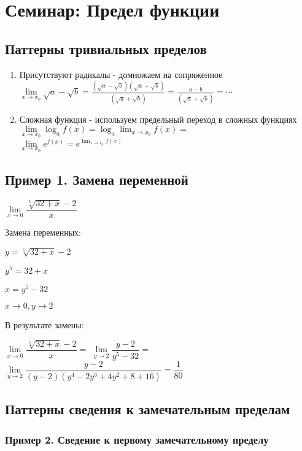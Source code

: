 \section{Семинар: Предел функции}

\subsection{Паттерны тривиальных пределов}

\begin{enumerate}
\item 
Присутствуют радикалы - домножаем на сопряженное
$\lim\limits_{x\to x_0} \sqrt{a} - \sqrt{b} = 
\frac{(\sqrt{a} - \sqrt{b})(\sqrt{a} + \sqrt{b})}{(\sqrt{a} + \sqrt{b})} =
\frac{a - b}{(\sqrt{a} + \sqrt{b})}  = \cdots $

\item 
Сложная функция - используем предельный переход в сложных функциях
$ \lim\limits_{x\to x_0} \log_a{f(x)} =  \log_a {\lim_{x\to x_0} {f(x)} } =  $ \\
$ \lim\limits_{x\to x_0} e^{f(x)} =  e^ {\lim_{x\to x_0} {f(x)} }  $

\end{enumerate}


\subsection{Пример 1. Замена переменной}

$ \lim\limits_{x\to 0} \dfrac{ \sqrt[5]{32+x} - 2 }{x} $

Замена переменных:

$ y = \sqrt[5]{32+x} - 2 $

$ y^{5} = 32+x $

$ x = y^{5} - 32 $

$ x \to 0, y \to 2 $

В результате замены:

$ \lim\limits_{x\to 0} \dfrac{ \sqrt[5]{32+x} - 2 }{x} = $
$ \lim\limits_{y\to 2} \dfrac{ y - 2 }{ y^{5} - 32 } =  $
$ \lim\limits_{y\to 2} \dfrac{ y - 2 }{ (y - 2)(y^{4}-2y^{3}+4y^{2}+8+16) } = \dfrac{1}{80}  $

\subsection{Паттерны сведения к замечательным пределам}

\subsubsection{Пример 2. Сведение к первому замечательному пределу}

